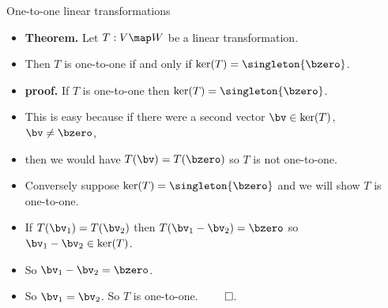 \documentclass{beamer}
\begin{document}
\begin{frame}{One-to-one linear transformations}

\begin{itemize}
\item \textbf{Theorem.} Let $T:V\map W$ be a linear transformation.
\item Then $T$ is one-to-one if and only if $\ker(T) = \singleton{\bzero}$.
\item \textbf{proof.} If $T$ is one-to-one then $\ker(T) = \singleton{\bzero}$.
\item This is easy because if there were a second vector $\bv\in\ker(T)$, $\bv\not=\bzero$,
\item then we would have $T(\bv) = T(\bzero)$ so $T$ is not one-to-one.
\item Conversely suppose $\ker(T) = \singleton{\bzero}$ and we will show $T$ is one-to-one.
\item If $T(\bv_1) = T(\bv_2)$ then $T(\bv_1  - \bv_2) = \bzero$ so $\bv_1 - \bv_2\in\ker(T)$.
\item So $\bv_1 - \bv_2 = \bzero$.
\item So $\bv_1 = \bv_2$. So $T$ is one-to-one. $\qed$.
\end{itemize}

\end{frame}
\end{document}
